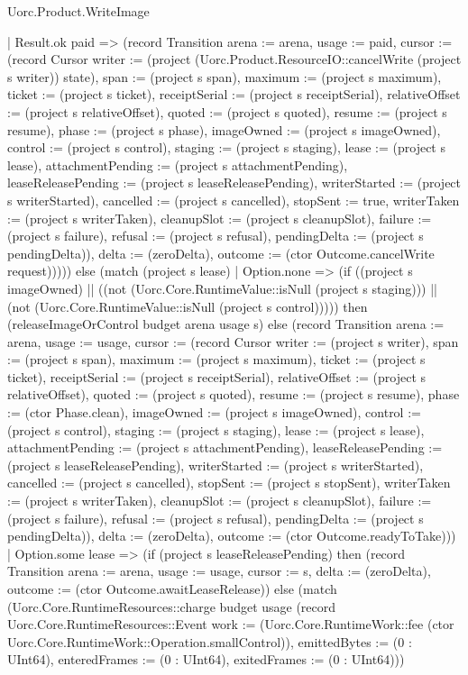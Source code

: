 \begin{lexlean}{Uorc.Product.WriteImage}
\begin{semanticmodule}
{        | Result.ok paid => (record Transition {arena := arena, usage := paid, cursor := (record Cursor {writer := (project (Uorc.Product.ResourceIO::cancelWrite (project s writer)) state), span := (project s span), maximum := (project s maximum), ticket := (project s ticket), receiptSerial := (project s receiptSerial), relativeOffset := (project s relativeOffset), quoted := (project s quoted), resume := (project s resume), phase := (project s phase), imageOwned := (project s imageOwned), control := (project s control), staging := (project s staging), lease := (project s lease), attachmentPending := (project s attachmentPending), leaseReleasePending := (project s leaseReleasePending), writerStarted := (project s writerStarted), cancelled := (project s cancelled), stopSent := true, writerTaken := (project s writerTaken), cleanupSlot := (project s cleanupSlot), failure := (project s failure), refusal := (project s refusal), pendingDelta := (project s pendingDelta)}), delta := (zeroDelta), outcome := (ctor Outcome.cancelWrite request)})))) else (match (project s lease)
      | Option.none => (if ((project s imageOwned) || ((not (Uorc.Core.RuntimeValue::isNull (project s staging))) || (not (Uorc.Core.RuntimeValue::isNull (project s control))))) then (releaseImageOrControl budget arena usage s) else (record Transition {arena := arena, usage := usage, cursor := (record Cursor {writer := (project s writer), span := (project s span), maximum := (project s maximum), ticket := (project s ticket), receiptSerial := (project s receiptSerial), relativeOffset := (project s relativeOffset), quoted := (project s quoted), resume := (project s resume), phase := (ctor Phase.clean), imageOwned := (project s imageOwned), control := (project s control), staging := (project s staging), lease := (project s lease), attachmentPending := (project s attachmentPending), leaseReleasePending := (project s leaseReleasePending), writerStarted := (project s writerStarted), cancelled := (project s cancelled), stopSent := (project s stopSent), writerTaken := (project s writerTaken), cleanupSlot := (project s cleanupSlot), failure := (project s failure), refusal := (project s refusal), pendingDelta := (project s pendingDelta)}), delta := (zeroDelta), outcome := (ctor Outcome.readyToTake)}))
      | Option.some lease => (if (project s leaseReleasePending) then (record Transition {arena := arena, usage := usage, cursor := s, delta := (zeroDelta), outcome := (ctor Outcome.awaitLeaseRelease)}) else (match (Uorc.Core.RuntimeResources::charge budget usage (record Uorc.Core.RuntimeResources::Event {work := (Uorc.Core.RuntimeWork::fee (ctor Uorc.Core.RuntimeWork::Operation.smallControl)), emittedBytes := (0 : UInt64), enteredFrames := (0 : UInt64), exitedFrames := (0 : UInt64)}))
}
\end{semanticmodule}
\end{lexlean}
